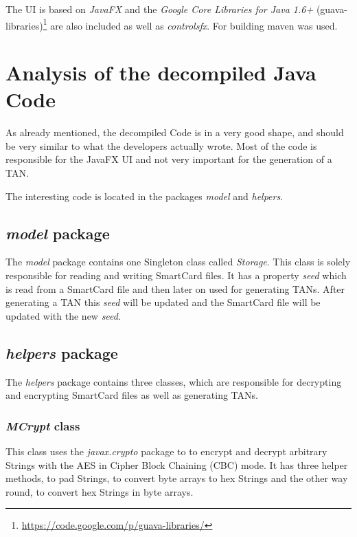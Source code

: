 The UI is based on \textit{JavaFX} and the \textit{Google Core Libraries for Java 1.6+} (guava-libraries)\footnote{\url{https://code.google.com/p/guava-libraries/}} are also included as well as \textit{controlsfx}. For building maven was used.

\section{Analysis of the decompiled Java Code}

As already mentioned, the decompiled Code is in a very good shape, and should be very similar to what the developers actually wrote. Most of the code is responsible for the JavaFX UI and not very important for the generation of a TAN.

The interesting code is located in the packages \textit{model} and \textit{helpers}. 

\subsection{\textit{model} package}

The \textit{model} package contains one Singleton class called \textit{Storage}. This class is solely responsible for reading and writing SmartCard files. It has a property \textit{seed} which is read from a SmartCard file and then later on used for generating TANs. After generating a TAN this \textit{seed} will be updated and the SmartCard file will be updated with the new \textit{seed}.

\subsection{\textit{helpers} package}

The \textit{helpers} package contains three classes, which are responsible for decrypting and encrypting SmartCard files as well as generating TANs.

\subsubsection{\textit{MCrypt} class}

This class uses the \textit{javax.crypto} package to to encrypt and decrypt arbitrary Strings with the AES in Cipher Block Chaining (CBC) mode. It has three helper methods, to pad Strings, to convert byte arrays to hex Strings and the other way round, to convert hex Strings in byte arrays.

